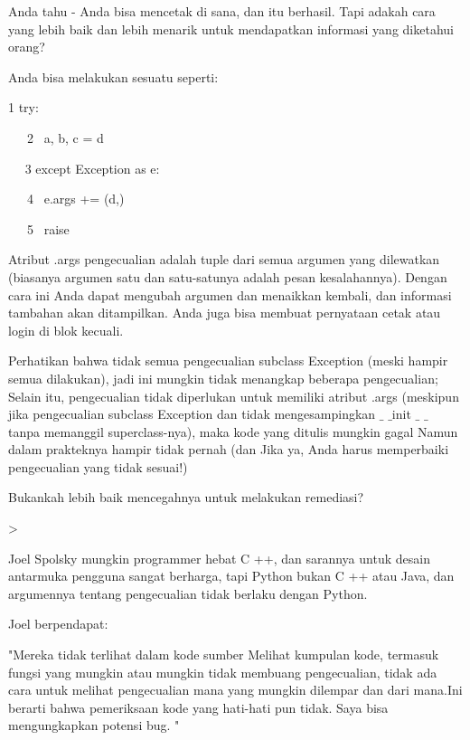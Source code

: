 \vspace{12pt}
Anda tahu - Anda bisa mencetak di sana, dan itu berhasil. Tapi adakah cara yang lebih baik dan lebih menarik untuk mendapatkan informasi yang diketahui orang? \par
\vspace{12pt}
Anda bisa melakukan sesuatu seperti: \par
\vspace{12pt}
1 try: \par
~~~2~  a, b, c = d \par
~~ 3 except Exception as e: \par
~~~4~  e.args += (d,) \par
~~~5~  raise \par
\vspace{12pt}
Atribut .args pengecualian adalah tuple dari semua argumen yang dilewatkan (biasanya argumen satu dan satu-satunya adalah pesan kesalahannya). Dengan cara ini Anda dapat mengubah argumen dan menaikkan kembali, dan informasi tambahan akan ditampilkan. Anda juga bisa membuat pernyataan cetak atau login di blok kecuali. \par
\vspace{12pt}
Perhatikan bahwa tidak semua pengecualian subclass Exception (meski hampir semua dilakukan), jadi ini mungkin tidak menangkap beberapa pengecualian; Selain itu, pengecualian tidak diperlukan untuk memiliki atribut .args (meskipun jika pengecualian subclass Exception dan tidak mengesampingkan  $  \_  $ $  \_  $init $  \_  $ $  \_  $ tanpa memanggil superclass-nya), maka kode yang ditulis mungkin gagal Namun dalam prakteknya hampir tidak pernah (dan Jika ya, Anda harus memperbaiki pengecualian yang tidak sesuai!) \par
\vspace{12pt}
Bukankah lebih baik mencegahnya untuk melakukan remediasi? \par
\vspace{12pt}
>  \par
\vspace{12pt}
Joel Spolsky mungkin programmer hebat C ++, dan sarannya untuk desain antarmuka pengguna sangat berharga, tapi Python bukan C ++ atau Java, dan argumennya tentang pengecualian tidak berlaku dengan Python. \par
\vspace{12pt}
Joel berpendapat: \par
\vspace{12pt}
"Mereka tidak terlihat dalam kode sumber Melihat kumpulan kode, termasuk fungsi yang mungkin atau mungkin tidak membuang pengecualian, tidak ada cara untuk melihat pengecualian mana yang mungkin dilempar dan dari mana.Ini berarti bahwa pemeriksaan kode yang hati-hati pun tidak. Saya bisa mengungkapkan potensi bug. " \par
